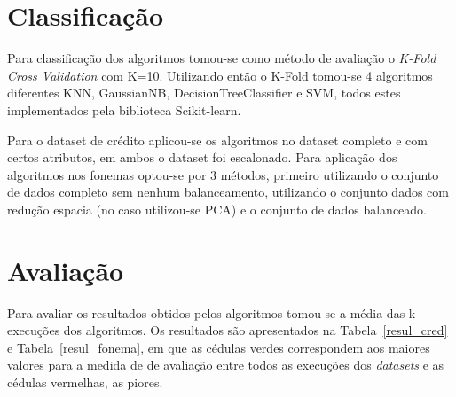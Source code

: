 \section{Classificação}
Para classificação dos algoritmos tomou-se como método de avaliação o \textit{K-Fold Cross Validation} com K=10. Utilizando então o K-Fold tomou-se 4 algoritmos diferentes KNN, GaussianNB, DecisionTreeClassifier e SVM, todos estes implementados pela biblioteca Scikit-learn.

Para o dataset de crédito aplicou-se os algoritmos no dataset completo e com certos atributos, em ambos o dataset foi escalonado. Para aplicação dos algoritmos nos fonemas optou-se por 3 métodos, primeiro utilizando o conjunto de dados completo sem nenhum balanceamento, utilizando o conjunto dados com redução espacia (no caso utilizou-se PCA) e o conjunto de dados balanceado.

\section{Avaliação}

Para avaliar os resultados obtidos pelos algoritmos tomou-se a média das k-execuções dos algoritmos. Os resultados são apresentados na Tabela~\ref{resul_cred} e Tabela~\ref{resul_fonema}, em que as cédulas verdes correspondem aos maiores valores para a medida de de avaliação entre todos as execuções dos \textit{datasets} e as cédulas vermelhas, as piores.

